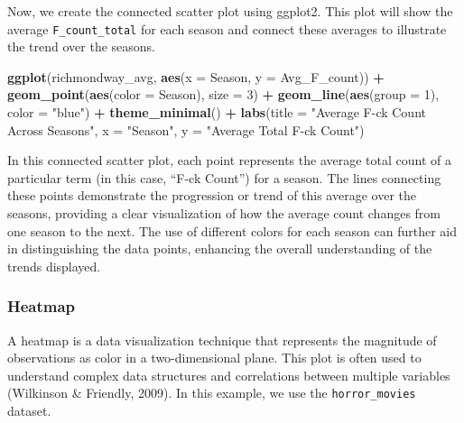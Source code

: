 \documentclass[
]{book}
\newenvironment{Shaded}{\begin{snugshade}}{\end{snugshade}}
\newcommand{\AttributeTok}[1]{\textcolor[rgb]{0.13,0.29,0.53}{#1}}
\newcommand{\DecValTok}[1]{\textcolor[rgb]{0.00,0.00,0.81}{#1}}
\newcommand{\FunctionTok}[1]{\textcolor[rgb]{0.13,0.29,0.53}{\textbf{#1}}}
\newcommand{\NormalTok}[1]{#1}
\newcommand{\SpecialCharTok}[1]{\textcolor[rgb]{0.81,0.36,0.00}{\textbf{#1}}}
\newcommand{\StringTok}[1]{\textcolor[rgb]{0.31,0.60,0.02}{#1}}
\begin{document}
Now, we create the connected scatter plot using ggplot2. This plot will show the average \texttt{F\_count\_total} for each season and connect these averages to illustrate the trend over the seasons.

\begin{Shaded}
\begin{Highlighting}[]
\FunctionTok{ggplot}\NormalTok{(richmondway\_avg, }\FunctionTok{aes}\NormalTok{(}\AttributeTok{x =}\NormalTok{ Season, }\AttributeTok{y =}\NormalTok{ Avg\_F\_count)) }\SpecialCharTok{+}
  \FunctionTok{geom\_point}\NormalTok{(}\FunctionTok{aes}\NormalTok{(}\AttributeTok{color =}\NormalTok{ Season), }\AttributeTok{size =} \DecValTok{3}\NormalTok{) }\SpecialCharTok{+}
  \FunctionTok{geom\_line}\NormalTok{(}\FunctionTok{aes}\NormalTok{(}\AttributeTok{group =} \DecValTok{1}\NormalTok{), }\AttributeTok{color =} \StringTok{"blue"}\NormalTok{) }\SpecialCharTok{+}
  \FunctionTok{theme\_minimal}\NormalTok{() }\SpecialCharTok{+}
  \FunctionTok{labs}\NormalTok{(}\AttributeTok{title =} \StringTok{"Average F{-}ck Count Across Seasons"}\NormalTok{,}
       \AttributeTok{x =} \StringTok{"Season"}\NormalTok{,}
       \AttributeTok{y =} \StringTok{"Average Total F{-}ck Count"}\NormalTok{)}
\end{Highlighting}
\end{Shaded}

In this connected scatter plot, each point represents the average total count of a particular term (in this case, ``F-ck Count'') for a season. The lines connecting these points demonstrate the progression or trend of this average over the seasons, providing a clear visualization of how the average count changes from one season to the next. The use of different colors for each season can further aid in distinguishing the data points, enhancing the overall understanding of the trends displayed.

\hypertarget{heatmap}{%
\subsubsection*{Heatmap}\label{heatmap}}

A heatmap is a data visualization technique that represents the magnitude of observations as color in a two-dimensional plane. This plot is often used to understand complex data structures and correlations between multiple variables (Wilkinson \& Friendly, 2009). In this example, we use the \texttt{horror\_movies} dataset.
\end{document}

